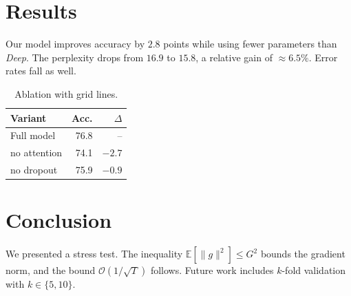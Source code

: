 \documentclass[10pt,twocolumn]{article}
\begin{document}
\section{Results}
Our model improves accuracy by $2.8$ points while using fewer parameters than \emph{Deep}. The perplexity
drops from $16.9$ to $15.8$, a relative gain of $\approx 6.5\%$. Error rates fall as well.

\begin{table}[h]
  \centering
  \caption{Ablation with grid lines.}
  \begin{tabular}{|l|r|r|}
    \hline
    Variant & Acc. & $\Delta$ \\ \hline
    Full model & 76.8 & -- \\ \hline
    no attention & 74.1 & $-2.7$ \\ \hline
    no dropout & 75.9 & $-0.9$ \\ \hline
  \end{tabular}
\end{table}

\section{Conclusion}
We presented a stress test. The inequality $\mathbb{E}[\|g\|^2] \le G^2$ bounds the gradient norm, and the
bound $\mathcal{O}(1/\sqrt{T})$ follows. Future work includes $k$-fold validation with $k \in \{5, 10\}$.
\end{document}
